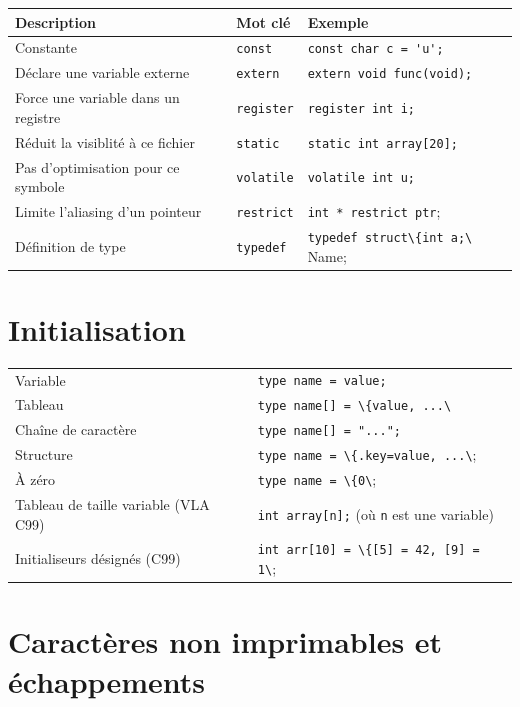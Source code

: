 \documentclass{article}
\newcommand{\cd}{\lstinline}
\begin{document}
\begin{multicols*}{3}
\begin{tabularx}{\linewidth}{X|l|l}
  \bf Description                     & \bf Mot clé & \bf Exemple \\
  \hline
  Constante                           & \cd{const}    & \cd{const char c = 'u';}\\
  Déclare une variable externe        & \cd{extern}   & \cd{extern void func(void);}\\
  Force une variable dans un registre & \cd{register} & \cd{register int i;}\\
  Réduit la visiblité à ce fichier    & \cd{static}   & \cd{static int array[20];}\\
  Pas d'optimisation pour ce symbole  & \cd{volatile} & \cd{volatile int u;}\\
  Limite l'aliasing d'un pointeur     & \cd{restrict} & \cd{int * restrict ptr};\\
  Définition de type                  & \cd{typedef} & \cd{typedef struct\{int a;\} Name;}\\
\end{tabularx}

\section*{Initialisation}
\begin{tabularx}{\linewidth}{Xl}
  Variable & \cd{type name = value;} \\
  Tableau & \cd{type name[] = \{value, ...\}}; \\
  Chaîne de caractère & \cd{type name[] = "...";} \\
  Structure & \cd{type name = \{.key=value, ...\};} \\
  À zéro & \cd{type name = \{0\};} \\
  Tableau de taille variable (VLA C99) & \cd{int array[n];} (où \cd{n} est une variable) \\
  Initialiseurs désignés (C99) & \cd{int arr[10] = \{[5] = 42, [9] = 1\};} \\
\end{tabularx}

\section*{Caractères non imprimables et échappements}
\begin{tabularx}{\linewidth}{
  >{\hsize=0.3\hsize}X%
  >{\hsize=0.2\hsize}X%
  >{\hsize=1.5\hsize}X%
  >{\hsize=0.3\hsize}X%
  >{\hsize=0.2\hsize}X%
  >{\hsize=1.5\hsize}X%
  }


\end{tabularx}
\end{multicols*}
\end{document}
